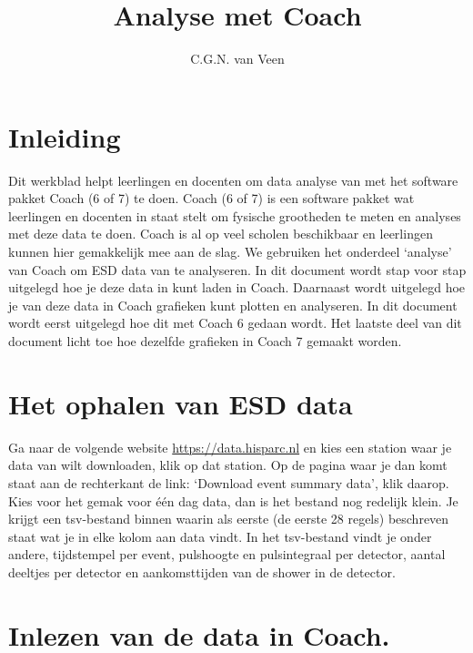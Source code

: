 

\title{Analyse met Coach}
\author{C.G.N. van Veen}



\maketitle

\section{Inleiding}

Dit werkblad helpt leerlingen en docenten om data analyse van \hisparc met
het software pakket Coach (6 of 7) te doen. Coach (6 of 7) is een software pakket wat leerlingen
en docenten in staat stelt om fysische grootheden te meten en analyses met deze
data te doen. Coach is al op veel scholen beschikbaar en leerlingen kunnen hier
gemakkelijk mee aan de slag.
We gebruiken het onderdeel `analyse' van Coach om ESD data van \hisparc te analyseren.
In dit document wordt stap voor stap uitgelegd hoe je deze data in kunt laden in
Coach. Daarnaast wordt uitgelegd hoe je van deze data in Coach
grafieken kunt plotten en analyseren. In dit document wordt eerst uitgelegd hoe
dit met Coach 6 gedaan wordt. Het laatste deel van dit document licht toe hoe dezelfde grafieken
in Coach 7 gemaakt worden.

\section{Het ophalen van ESD data}

Ga naar de volgende website \url{https://data.hisparc.nl} en kies een station waar
je data van wilt downloaden, klik op dat station. Op de pagina waar je dan komt
staat aan de rechterkant de link: `Download event summary data', klik daarop.
Kies voor het gemak voor één dag data, dan is het bestand nog redelijk klein.
Je krijgt een tsv-bestand binnen waarin als eerste (de eerste 28 regels) beschreven staat wat je
in elke kolom aan data vindt. In het tsv-bestand vindt je onder andere, tijdstempel per event,
pulshoogte en pulsintegraal per detector, aantal deeltjes per detector en aankomsttijden van
de shower in de detector.

\section{Inlezen van de data in Coach.}

